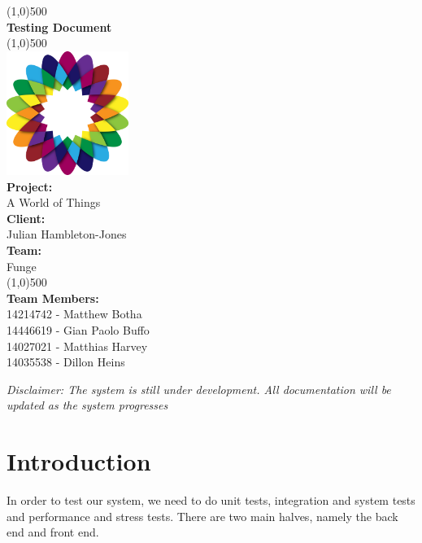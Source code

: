 \documentclass{article}
\begin{document}
\begin{titlepage}
	\begin{center}
		\line(1,0){500}\\
		[6mm]
		\huge{\bfseries Testing Document}\\
		\line(1,0){500}\\
		[5mm]
		\includegraphics[width=150px]{../images/AWorldOfPlants.png}
		\\
		[5mm]
		\large\textbf{Project:}\\A World of Things\\
		[3mm]
		\large\textbf{Client:}\\Julian Hambleton-Jones\\
		[3mm]
		\large \textbf{Team:}\\Funge\\
		\line(1,0){500}\\
		[5mm]
		\large \textbf{Team Members:}\\
		[3mm]
		\large 14214742 - Matthew Botha\\
		\large 14446619 - Gian Paolo Buffo\\
		\large 14027021 - Matthias Harvey\\
        \large 14035538 - Dillon Heins\\[3mm]
	\end{center}
\end{titlepage}

\cleardoublepage
\thispagestyle{empty}
\tableofcontents

\cleardoublepage
\setcounter{page}{1}

\textit{Disclaimer: The system is still under development. All documentation will be updated as the system progresses}

\section{Introduction}
	In order to test our system, we need to do unit tests, integration and system tests and performance and stress tests. There are two main halves, namely the back end and front end.
	
\end{document}
